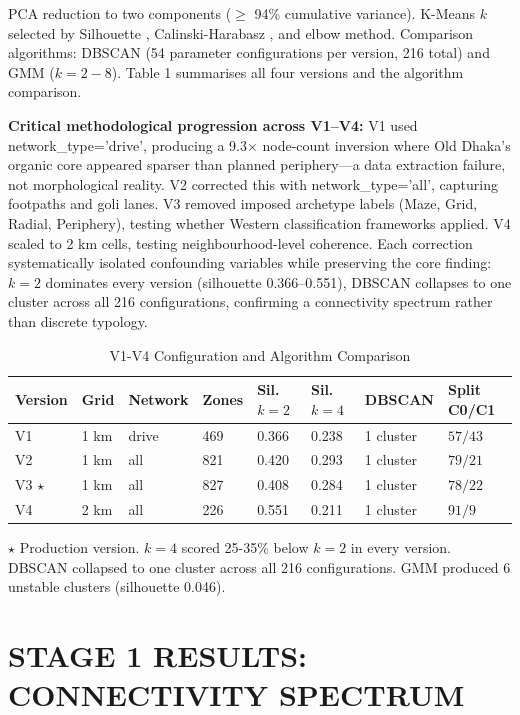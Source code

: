 \documentclass[sigconf, nonacm]{acmart}
\begin{document}
PCA reduction to two components ($\geq$ 94\% cumulative variance). K-Means $k$ selected by Silhouette \cite{rousseeuw1987}, Calinski-Harabasz \cite{calinski1974}, and elbow method. Comparison algorithms: DBSCAN (54 parameter configurations per version, 216 total) and GMM ($k = 2 - 8$). Table 1 summarises all four versions and the algorithm comparison.

\textbf{Critical methodological progression across V1--V4:} V1 used network\_type='drive', producing a 9.3$\times$ node-count inversion where Old Dhaka's organic core appeared sparser than planned periphery—a data extraction failure, not morphological reality. V2 corrected this with network\_type='all', capturing footpaths and goli lanes. V3 removed imposed archetype labels (Maze, Grid, Radial, Periphery), testing whether Western classification frameworks applied. V4 scaled to 2 km cells, testing neighbourhood-level coherence. Each correction systematically isolated confounding variables while preserving the core finding: $k = 2$ dominates every version (silhouette 0.366--0.551), DBSCAN collapses to one cluster across all 216 configurations, confirming a connectivity spectrum rather than discrete typology.

\begin{table}[t]
\caption{V1-V4 Configuration and Algorithm Comparison}
\begin{tabular}{llllllll}
\toprule
Version & Grid & Network & Zones & Sil. $k=2$ & Sil. $k=4$ & DBSCAN & Split C0/C1 \\
\midrule
V1 & 1 km & drive & 469 & 0.366 & 0.238 & 1 cluster & $57/43$ \\
V2 & 1 km & all & 821 & 0.420 & 0.293 & 1 cluster & $79/21$ \\
V3 $\star$ & 1 km & all & 827 & 0.408 & 0.284 & 1 cluster & $78/22$ \\
V4 & 2 km & all & 226 & 0.551 & 0.211 & 1 cluster & $91/9$ \\
\bottomrule
\end{tabular}
\end{table}

$\star$ Production version. $k=4$ scored 25-35\% below $k=2$ in every version. DBSCAN collapsed to one cluster across all 216 configurations. GMM produced 6 unstable clusters (silhouette 0.046).

\section{STAGE 1 RESULTS: CONNECTIVITY SPECTRUM}
\end{document}

